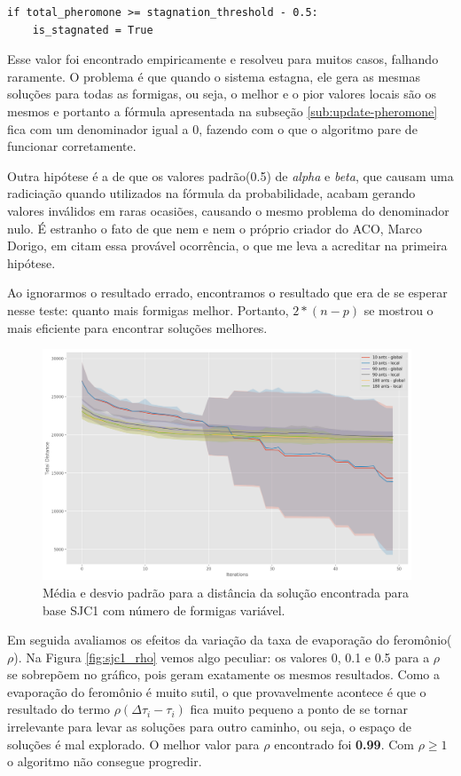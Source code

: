 \medskip
\begin{lstlisting}
if total_pheromone >= stagnation_threshold - 0.5:
	is_stagnated = True
\end{lstlisting}
\medskip
    
Esse valor foi encontrado empiricamente e resolveu para muitos casos, falhando raramente. O problema é que quando o sistema estagna, ele gera as mesmas soluções para todas as formigas, ou seja, o melhor e o pior valores locais são os mesmos e portanto a fórmula apresentada na subseção \ref{sub:update-pheromone} fica com um denominador igual a 0, fazendo com o que o algoritmo pare de funcionar corretamente.

Outra hipótese é a de que os valores padrão(0.5) de \textit{alpha} e \textit{beta}, que causam uma radiciação quando utilizados na fórmula da probabilidade, acabam gerando valores inválidos em raras ocasiões, causando o mesmo problema do denominador nulo. É estranho o fato de que nem \cite{de2005max} e nem o próprio criador do ACO, Marco Dorigo, em \cite{dorigo2003ant} citam essa provável ocorrência, o que me leva a acreditar na primeira hipótese.

Ao ignorarmos o resultado errado, encontramos o resultado que era de se esperar nesse teste: quanto mais formigas melhor. Portanto, $2 * (n - p)$ se mostrou o mais eficiente para encontrar soluções melhores.

\begin{figure}[h]	
  \centering
  \includegraphics[width=11cm,keepaspectratio]{images/SJC1_ants.png}
  \caption{Média e desvio padrão para a distância da solução encontrada para base SJC1 com número de formigas variável.}
  \label{fig:sjc1_ants}
\end{figure}

Em seguida avaliamos os efeitos da variação da taxa de evaporação do feromônio($\rho$). Na Figura \ref{fig:sjc1_rho} vemos algo peculiar: os valores 0, 0.1 e 0.5 para a $\rho$ se sobrepõem no gráfico, pois geram exatamente os mesmos resultados. Como a evaporação do feromônio é muito sutil, o que provavelmente acontece é que o resultado do termo $\rho(\Delta\tau_i - \tau_i)$ fica muito pequeno a ponto de se tornar irrelevante para levar as soluções para outro caminho, ou seja, o espaço de soluções é mal explorado. O melhor valor para $\rho$ encontrado foi \textbf{0.99}. Com $\rho \geq 1$ o algoritmo não consegue progredir.

